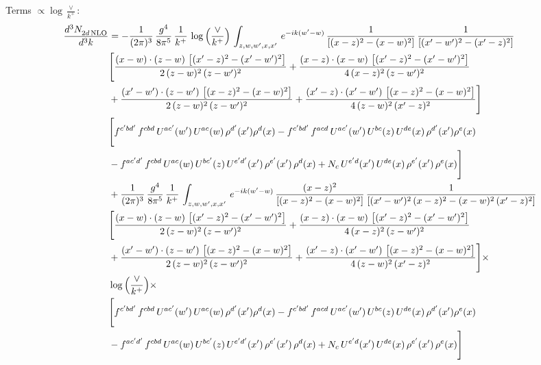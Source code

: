 \documentclass[10pt]{article}
\numberwithin{equation}{section}
\begin{document}
\noindent Terms $\propto\log\frac{\vee}{k^+}$:
\begin{align}
 \frac{d^{3}N_{2d\,\rm NLO}^{\rm}}{d^{3}k}  & =  -\frac{1}{(2\pi)^{3}}\, \frac{g^{4}}{8\pi^{5}}\,\frac{1}{k^{+}}\,\log{\left(\frac{\vee}{k^{+}}\right)}\,\int_{z,w,w^{\prime},x,x'}\, e^{-ik(w^{\prime}-w)}\,\frac{1}{\left[(x-z)^{2}-(x-w)^{2}\right]}\, \frac{1}{\left[(x'-w')^{2}-(x'-z)^{2}\right]}\notag \\ & \Bigg[\frac{(x-w)\cdot (z-w)\, \left[(x'-z)^{2}-(x'-w')^{2}\right]}{2\, (z-w)^{2}\, (z-w')^{2}}  + \frac{(x-z)\cdot (x-w)\,\left[(x'-z)^{2}-(x'-w')^{2}\right] }{4\,(x-z)^{2}\,(z-w')^{2}}\notag \\ & +\frac{(x'-w')\cdot (z-w')\, \left[(x-z)^{2}-(x-w)^{2}\right]}{2\, (z-w)^{2}\, (z-w')^{2}}+ \frac{(x'-z)\cdot (x'-w')\, \left[(x-z)^{2}-(x-w)^{2}\right]}{4\, (z-w)^{2}\,(x'-z)^{2}}\Bigg] \notag \\ &  \Bigg[f^{c'bd'}\,f^{cbd}\, U^{ac'}(w')\,U^{ac}(w)\,\rho^{d'}(x')\rho^{d}(x)- f^{c'bd'}\,f^{acd}\,U^{ac'}(w')\,U^{bc}(z)\,U^{de}(x)\,\rho^{d'}(x')\rho^{e}(x) \notag \\ & -f^{ac'd'}\,f^{cbd}\,U^{ac}(w)\,U^{bc'}(z)\,U^{e'd'}(x')\,\rho^{e'}(x')\,\rho^{d}(x) +N_{c}\,U^{e'd}(x')\,U^{de}(x)\,\rho^{e'}(x')\,\rho^{e}(x)\Bigg]  \notag \\
& +\frac{1}{(2\pi)^{3}}\, \frac{g^{4}}{8\pi^{5}}\,\frac{1}{k^{+}}\,\int_{z,w,w^{\prime},x,x'}\, e^{-ik(w^{\prime}-w)}\,\frac{(x-z)^{2}}{\left[(x-z)^{2}-(x-w)^{2}\right]}\,\frac{1}{\left[(x'-w')^{2}\,(x-z)^{2} - (x-w)^{2}\,(x'-z)^{2}\right]}\notag \\ & \Bigg[\frac{(x-w)\cdot (z-w)\, \left[(x'-z)^{2}-(x'-w')^{2}\right]}{2\, (z-w)^{2}\, (z-w')^{2}}  + \frac{(x-z)\cdot (x-w)\,\left[(x'-z)^{2}-(x'-w')^{2}\right] }{4\,(x-z)^{2}\,(z-w')^{2}}\notag \\ & +\frac{(x'-w')\cdot (z-w')\, \left[(x-z)^{2}-(x-w)^{2}\right]}{2\, (z-w)^{2}\, (z-w')^{2}}+ \frac{(x'-z)\cdot (x'-w')\, \left[(x-z)^{2}-(x-w)^{2}\right]}{4\, (z-w)^{2}\,(x'-z)^{2}}\Bigg]\times\,\notag \\ & \log{\left(\frac{\vee}{k^{+}}\right)} \times\notag \\ & \Bigg[f^{c'bd'}\,f^{cbd}\, U^{ac'}(w')\,U^{ac}(w)\,\rho^{d'}(x')\rho^{d}(x)- f^{c'bd'}\,f^{acd}\,U^{ac'}(w')\,U^{bc}(z)\,U^{de}(x)\,\rho^{d'}(x')\rho^{e}(x) \notag \\ & -f^{ac'd'}\,f^{cbd}\,U^{ac}(w)\,U^{bc'}(z)\,U^{e'd'}(x')\,\rho^{e'}(x')\,\rho^{d}(x) +N_{c}\,U^{e'd}(x')\,U^{de}(x)\,\rho^{e'}(x')\,\rho^{e}(x)\Bigg] \notag \\

\end{align}
\end{document}
